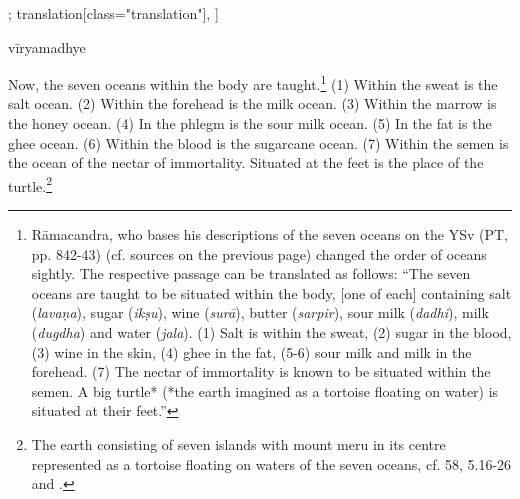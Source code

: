 \begin{alignment}[
  texts=edition[class="edition"];
  translation[class="translation"],
  ]
\begin{edition}
\begin{prose}[p37_01]
vīryamadhye\dd{}
\dd{}
\end{prose}
  \end{edition}
  \begin{translation}
    \begin{tlate}[p37_01]
     \noindent
Now, the seven oceans within the body are taught.\footnote{Rāmacandra, who bases his descriptions of the seven oceans on the YSv (PT, pp. 842-43) (cf. sources on the previous page) changed the order of oceans sightly. The respective passage can be translated as follows: ``The seven oceans are taught to be situated within the body, [one of each] containing salt (\textit{lavaṇa}), sugar (\textit{ikṣu}), wine (\textit{surā}), butter (\textit{sarpir}), sour milk (\textit{dadhi}), milk (\textit{dugdha}) and water (\textit{jala}). (1) Salt is within the sweat, (2) sugar in the blood, (3) wine in the skin, (4) ghee in the fat, (5-6) sour milk and milk in the forehead. (7) The nectar of immortality is known to be situated within the semen. A big turtle* (*the earth imagined as a tortoise floating on water) is situated at their feet.''} (1) Within the sweat is the salt ocean. (2) Within the forehead is the milk ocean. (3) Within the marrow is the honey ocean. (4) In the phlegm is the sour milk ocean. (5) In the fat is the ghee ocean. (6) Within the blood is the sugarcane ocean. (7) Within the semen is the ocean of the nectar of immortality. Situated at the feet is the place of the turtle.\footnote{The earth consisting of seven islands with mount meru in its centre represented as a tortoise floating on waters of the seven oceans, cf.  58,  5.16-26 and \citeauthor[2009: 354]{bryant2009}.}
\flushpage
\end{tlate}
  \end{translation}
\end{alignment}
\pagebreak %
